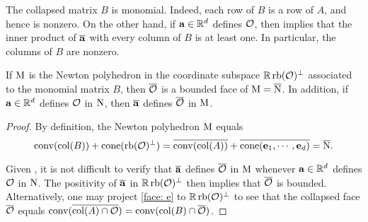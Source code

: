 \documentclass[11pt]{amsart}
\renewcommand{\!}[1]{{\color{red}\text{$\star$\,}#1\,$\star$}}
\newcommand{\ol}[1]{\overline{#1}}
\begin{document}
\begin{remark}
\label{collapse of monomial is monomial: R}
The collapsed matrix $B$ is monomial.  Indeed, each row of $B$ is a row of $A$, and hence is nonzero.   On the other hand, if $\mathbf{a} \in \mathbb{R}^d$ defines $\mathcal{O}$, then  implies that the inner product of $\ol{\vv{a}}$ with every column of $B$ is at least one.  In particular, the columns of $B$ are nonzero.
\end{remark}


%


\begin{lemma}
\label{collapse of Newton polyhedron: L} 
If $\mathrm{M}$ is the Newton polyhedron in the coordinate subspace $\mathbb{R} \operatorname{rb}(\mathcal{O})^{\perp}$ associated to the monomial matrix $B$, then $\ol{\O}$ is a bounded face of $\M = \ol{\N}$.    In addition, if $\mathbf{a} \in \mathbb{R}^d$ defines $\mathcal{O}$ in $\mathrm{N}$, then $ \ol{\vv{a}}$ defines $\ol{\O}$ in $\mathrm{M}$. 
\end{lemma}

\begin{proof}
By definition, the Newton polyhedron $\mathrm{M}$ equals
%
\[  \conv( \col(B) ) + \cone(\rb(\O)^{\perp}) =  \ol{\conv( \col(A))} + \ol{\cone(\vv{e}_1, \cdots, \vv{e}_d)} =  \ol{\N}.\]

Given , it is not difficult to verify that $\ol{\vv{a}}$ defines $\ol{\O}$ in $\mathrm{M}$ whenever $\mathbf{a} \in \mathbb{R}^d$ defines $\mathcal{O}$ in $\mathrm{N}$.  The positivity of $\ol{\vv{a}}$ in $\mathbb{R} \operatorname{rb}(\mathcal{O})^{\perp}$ then implies that $\ol{\O}$ is bounded.  Alternatively, one may project \eqref{face: e} to $\mathbb{R} \operatorname{rb}(\mathcal{O})^{\perp}$ to see that the collapsed face $\ol{\O}$ equals $\conv( \ol{ \col(A) \cap \O}) = \conv( \col(B) \cap \ol{\O})$.  
\end{proof}
\end{document}
